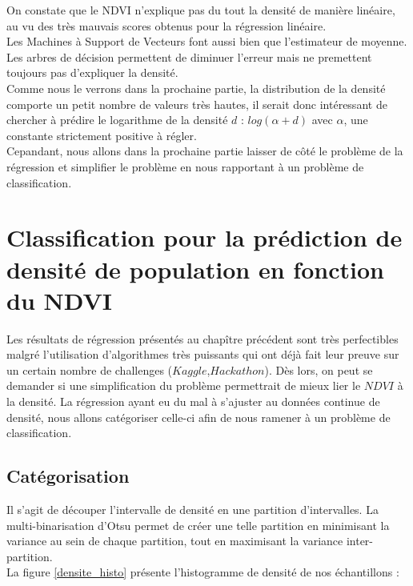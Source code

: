 \documentclass{book}
\begin{document}
On constate que le NDVI n'explique pas du tout la densité de manière linéaire, au vu des très mauvais scores obtenus pour la régression linéaire.\\
Les Machines à Support de Vecteurs font aussi bien que l'estimateur de moyenne.\\
Les arbres de décision permettent de diminuer l'erreur mais ne premettent toujours pas d'expliquer la densité.\\
Comme nous le verrons dans la prochaine partie, la distribution de la densité comporte un petit nombre de valeurs très hautes, il serait donc intéressant
de chercher à prédire le logarithme de la densité $d$ : $log(\alpha+d)$ avec $\alpha$, une constante strictement positive à régler.\\
Cepandant, nous allons dans la prochaine partie laisser de côté le problème de la régression et simplifier le problème en nous
rapportant à un problème de classification.\\

\chapter{Classification pour la prédiction de densité de population en fonction du NDVI}

Les résultats de régression présentés au chapître précédent sont très perfectibles malgré l'utilisation d'algorithmes très puissants qui ont déjà fait leur
preuve sur un certain nombre de challenges ($Kaggle$,$Hackathon$). Dès lors, on peut se demander si une simplification du problème permettrait de mieux lier
le $NDVI$ à la densité. La régression ayant eu du mal à s'ajuster au données continue de densité, nous allons catégoriser celle-ci afin de nous ramener à un
problème de classification.

\section{Catégorisation}
Il s'agit de découper l'intervalle de densité en une partition d'intervalles. La multi-binarisation d'Otsu permet de créer une telle partition en
minimisant la variance au sein de chaque partition, tout en maximisant la variance inter-partition.\\
La figure \ref{densite_histo} présente l'histogramme de densité de nos échantillons :
\end{document}
